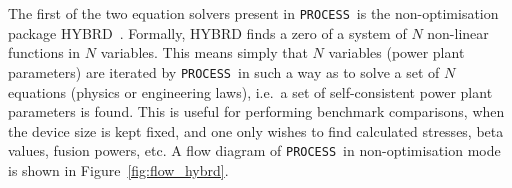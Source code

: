 \documentclass[11pt,a4paper]{report}
\newcommand{\process}{\mbox{\texttt{PROCESS}}}
\begin{document}
The first of the two equation solvers present in \process\ is the
non-optimisation package HYBRD~\cite{hybrd_anl,hybrd}. Formally, HYBRD
finds a zero of a system of $N$ non-linear functions in $N$ variables. This
means simply that $N$ variables (power plant parameters) are iterated by
\process\ in such a way as to solve a set of $N$ equations (physics or
engineering laws), i.e.\ a set of self-consistent power plant parameters is
found. This is useful for performing benchmark comparisons, when the device
size is kept fixed, and one only wishes to find calculated stresses, beta
values, fusion powers, etc. A flow diagram of \process\ in non-optimisation
mode is shown in Figure~\ref{fig:flow_hybrd}.


\setlength{\unitlength}{1mm}
\end{document}
